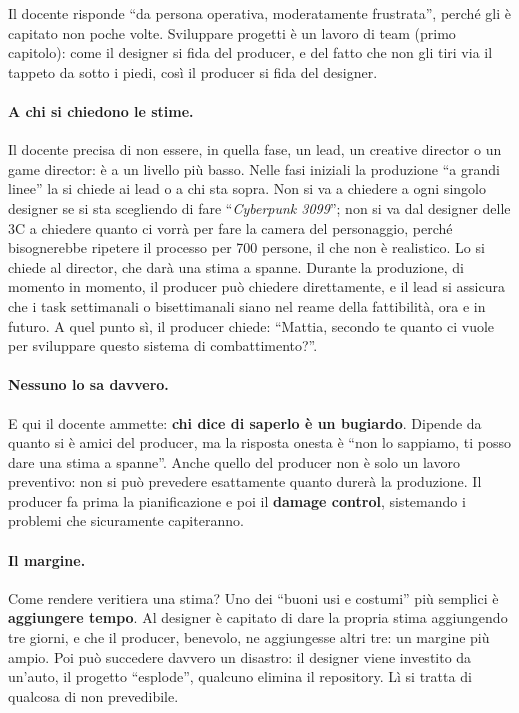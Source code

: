 Il docente risponde ``da persona operativa, moderatamente frustrata'', perché
gli è capitato non poche volte. Sviluppare progetti è un lavoro di team
(primo capitolo): come il designer si fida del producer, e del fatto che non
gli tiri via il tappeto da sotto i piedi, così il producer si fida del
designer.

\paragraph{A chi si chiedono le stime.} Il docente precisa di non essere, in
quella fase, un lead, un creative director o un game director: è a un livello
più basso. Nelle fasi iniziali la produzione ``a grandi linee'' la si chiede
ai lead o a chi sta sopra. Non si va a chiedere a ogni singolo designer se si
sta scegliendo di fare ``\emph{Cyberpunk 3099}''; non si va dal designer
delle 3C a chiedere quanto ci vorrà per fare la camera del personaggio,
perché bisognerebbe ripetere il processo per 700 persone, il che non è
realistico. Lo si chiede al director, che darà una stima a spanne. Durante la
produzione, di momento in momento, il producer può chiedere direttamente, e
il lead si assicura che i task settimanali o bisettimanali siano nel reame
della fattibilità, ora e in futuro. A quel punto sì, il producer chiede:
``Mattia, secondo te quanto ci vuole per sviluppare questo sistema di
combattimento?''.

\paragraph{Nessuno lo sa davvero.} E qui il docente ammette: \textbf{chi dice
di saperlo è un bugiardo}. Dipende da quanto si è amici del producer, ma la
risposta onesta è ``non lo sappiamo, ti posso dare una stima a spanne''.
Anche quello del producer non è solo un lavoro preventivo: non si può
prevedere esattamente quanto durerà la produzione. Il producer fa prima la
pianificazione e poi il \textbf{damage control}, sistemando i problemi che
sicuramente capiteranno.

\paragraph{Il margine.} Come rendere veritiera una stima? Uno dei ``buoni usi
e costumi'' più semplici è \textbf{aggiungere tempo}. Al designer è capitato
di dare la propria stima aggiungendo tre giorni, e che il producer, benevolo,
ne aggiungesse altri tre: un margine più ampio. Poi può succedere davvero un
disastro: il designer viene investito da un'auto, il progetto ``esplode'',
qualcuno elimina il repository. Lì si tratta di qualcosa di non prevedibile.

